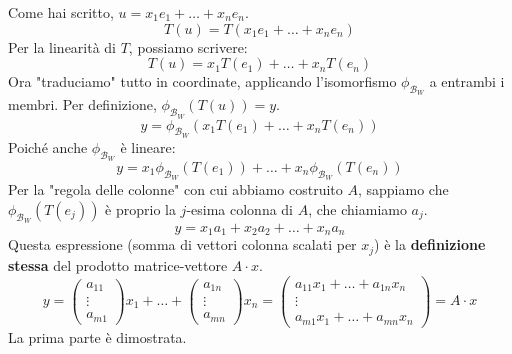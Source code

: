 {{    Come hai scritto, \(u = x_1 e_1 + \dots + x_n e_n\).
    \[
    T(u) = T(x_1 e_1 + \dots + x_n e_n)
    \]
    Per la linearità di \(T\), possiamo scrivere:
    \[
    T(u) = x_1 T(e_1) + \dots + x_n T(e_n)
    \]
    Ora "traduciamo" tutto in coordinate, applicando l'isomorfismo \(\phi_{\mathcal{B}_W}\) a entrambi i membri. Per definizione, \(\phi_{\mathcal{B}_W}(T(u)) = y\).
    \[
    y = \phi_{\mathcal{B}_W} (x_1 T(e_1) + \dots + x_n T(e_n))
    \]
    Poiché anche \(\phi_{\mathcal{B}_W}\) è lineare:
    \[
    y = x_1 \phi_{\mathcal{B}_W}(T(e_1)) + \dots + x_n \phi_{\mathcal{B}_W}(T(e_n))
    \]
    Per la "regola delle colonne" con cui abbiamo costruito \(A\), sappiamo che \(\phi_{\mathcal{B}_W}(T(e_j))\) è proprio la \(j\)-esima colonna di \(A\), che chiamiamo \(a_j\).
    \[
    y = x_1 a_1 + x_2 a_2 + \dots + x_n a_n
    \]
    Questa espressione (somma di vettori colonna scalati per \(x_j\)) è la \textbf{definizione stessa} del prodotto matrice-vettore \(A \cdot x\).
    \[
    y = \begin{pmatrix} a_{11} \\ \vdots \\ a_{m1} \end{pmatrix} x_1 + \dots + \begin{pmatrix} a_{1n} \\ \vdots \\ a_{mn} \end{pmatrix} x_n
    = \begin{pmatrix}
    a_{11} x_1 + \dots + a_{1n} x_n \\
    \vdots \\
    a_{m1} x_1 + \dots + a_{mn} x_n
    \end{pmatrix}
    = A \cdot x
    \]
    La prima parte è dimostrata.
    
    
    }
}

